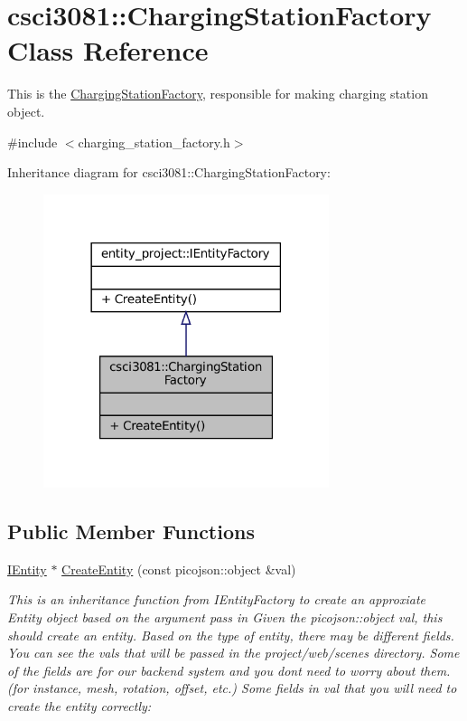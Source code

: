 \hypertarget{classcsci3081_1_1ChargingStationFactory}{}\section{csci3081\+:\+:Charging\+Station\+Factory Class Reference}
\label{classcsci3081_1_1ChargingStationFactory}


This is the \hyperlink{classcsci3081_1_1ChargingStationFactory}{Charging\+Station\+Factory}, responsible for making charging station object.  




{\ttfamily \#include $<$charging\+\_\+station\+\_\+factory.\+h$>$}



Inheritance diagram for csci3081\+:\+:Charging\+Station\+Factory\+:
\nopagebreak
\begin{figure}[H]
\begin{center}
\leavevmode
\includegraphics[width=237pt]{classcsci3081_1_1ChargingStationFactory__inherit__graph}
\end{center}
\end{figure}
\subsection*{Public Member Functions}
\begin{DoxyCompactItemize}
\item 
\hyperlink{classentity__project_1_1IEntity}{I\+Entity} $\ast$ \hyperlink{classcsci3081_1_1ChargingStationFactory_ad7099c9c36583ea8f608cef89200c8e9}{Create\+Entity} (const picojson\+::object \&val)
\begin{DoxyCompactList}\small\item\em This is an inheritance function from I\+Entity\+Factory to create an approxiate Entity object based on the argument pass in Given the picojson\+::object val, this should create an entity. Based on the type of entity, there may be different fields. You can see the vals that will be passed in the project/web/scenes directory. Some of the fields are for our backend system and you don\textquotesingle{}t need to worry about them. (for instance, mesh, rotation, offset, etc.) Some fields in val that you will need to create the entity correctly\+: \end{DoxyCompactList}\end{DoxyCompactItemize}


